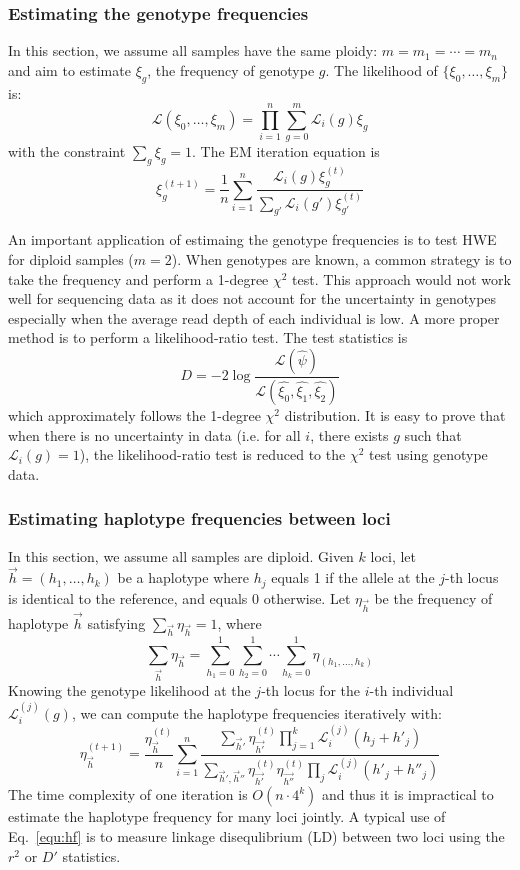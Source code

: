 \documentclass{bioinfo}
\begin{document}
\begin{methods}
\subsubsection{Estimating the genotype frequencies}
In this section, we assume all samples have the same ploidy: $m=m_1=\cdots=m_n$
and aim to estimate $\xi_g$, the frequency of genotype $g$. The likelihood
of $\{\xi_0,\ldots,\xi_m\}$ is:
\begin{equation}
\mathcal{L}(\xi_0,\ldots,\xi_m)=\prod_{i=1}^n\sum_{g=0}^{m}\mathcal{L}_i(g)\xi_g
\end{equation}
with the constraint $\sum_g\xi_g=1$. The EM iteration equation is
\begin{equation}
\xi^{(t+1)}_g=\frac{1}{n}\sum_{i=1}^n\frac{\mathcal{L}_i(g)\xi^{(t)}_g}{\sum_{g'}\mathcal{L}_i(g')\xi_{g'}^{(t)}}
\end{equation}

An important application of estimaing the genotype frequencies is to test HWE for diploid samples ($m=2$).
When genotypes are known, a common strategy is to take the frequency and perform a 1-degree $\chi^2$ test. This
approach would not work well for sequencing data as it does not account for the uncertainty in
genotypes especially when the average read depth of each individual is low. A more proper
method is to perform a likelihood-ratio test. The test statistics is
$$
D=-2\log\frac{\mathcal{L}(\hat{\psi})}{\mathcal{L}(\hat{\xi_0},\hat{\xi_1},\hat{\xi_2})}
$$
which approximately follows the 1-degree $\chi^2$ distribution.
It is easy to prove that when there is no uncertainty in data (i.e. for all $i$, there exists
$g$ such that $\mathcal{L}_i(g)=1$), the likelihood-ratio test
is reduced to the $\chi^2$ test using genotype data.

\subsubsection{Estimating haplotype frequencies between loci}
In this section, we assume all samples are diploid. Given $k$ loci,
let $\vec{h}=(h_1,\ldots,h_k)$ be a haplotype where $h_j$ equals 1 if
the allele at the $j$-th locus is identical to the reference, and equals 0 otherwise.
Let $\eta_{\vec{h}}$ be the frequency of haplotype $\vec{h}$ satisfying
$\sum_{\vec{h}}\eta_{\vec{h}}=1$, where
$$
\sum_{\vec{h}}\eta_{\vec{h}}=\sum_{h_1=0}^1\sum_{h_2=0}^1\cdots\sum_{h_k=0}^1\eta_{(h_1,\ldots,h_k)}
$$
Knowing the genotype likelihood at the $j$-th locus for the $i$-th individual $\mathcal{L}^{(j)}_i(g)$, we
can compute the haplotype frequencies iteratively with:
\begin{equation}\label{equ:hf}
\eta^{(t+1)}_{\vec{h}}=\frac{\eta_{\vec{h}}^{(t)}}{n}\sum_{i=1}^n\frac{\sum_{\vec{h}'}\eta_{\vec{h'}}^{(t)}\prod_{j=1}^k\mathcal{L}^{(j)}_i(h_j+h'_j)}
{\sum_{\vec{h}',\vec{h}''}\eta_{\vec{h'}}^{(t)}\eta_{\vec{h''}}^{(t)}\prod_{j}\mathcal{L}^{(j)}_i(h'_j+h''_j)}
\end{equation}
The time complexity of one iteration is $O(n\cdot 4^k)$ and thus
it is impractical to estimate the haplotype frequency for many loci jointly.
A typical use of Eq.~\eqref{equ:hf} is to measure linkage disequlibrium
(LD) between two loci using the $r^2$ or $D'$ statistics.


\end{methods}
\end{document}
